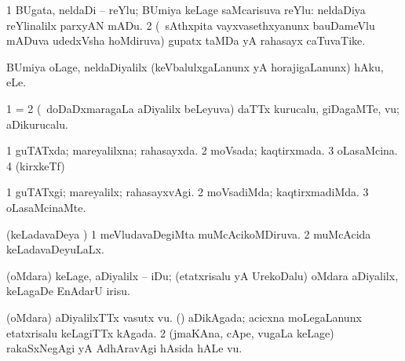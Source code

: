 {\bentry
{} 
\gl{\nA}
\expl{}
\bmng
\bnum
\num{1} BUgata, neldaDi -- reYlu; BUmiya keLage saMcarisuva reYlu:  neldaDiya reYlinalilx parxyAN mADu. 
\num{2} (\kanmu\ sAthxpita vayxvasethxyanunx bauDameVlu mADuva udedxVsha hoMdiruva) gupatx taMDa yA rahasayx caTuvaTike. 
\enum
\emng
\eentry

\bentry
{} 
\gl{\sakirx}
\expl{}
\bmng
 BUmiya oLage, neldaDiyalilx (keVbalulxgaLanunx yA horajigaLanunx) hAku, eLe. 
\emng
\eentry

\bentry
{} 
\gl{\nA}
\expl{}
\bmng
\bnum
\num{1} =  
\num{2} (\kanmu\ doDaDxmaragaLa aDiyalilx beLeyuva) daTTx kurucalu, giDagaMTe, \mo vu; aDikurucalu. 
\enum
\emng
\eentry

\bentry
{} 
\gl{\gu}
\expl{}
\bmng
\bnum
\num{1} guTATxda; mareyalilxna; rahasayxda. 
\num{2} moVsada; kaqtirxmada. 
\num{3} oLasaMcina. 
\num{4} (kirxkeTf)  
\enum
\emng
\eentry

\bentry
{} 
\gl{\kirxvi}
\expl{}
\bmng
\bnum
\num{1} guTATxgi; mareyalilx; rahasayxvAgi. 
\num{2} moVsadiMda; kaqtirxmadiMda. 
\num{3} oLasaMcinaMte. 
\enum
\emng
\eentry

\bentry
{} 
\gl{\gu}
\expl{}
\bmng
\emng
\eentry

\bentry
{} 
\gl{\kirxvi}
\expl{}
\bmng
\emng
\eentry

\bentry
{} 
\gl{\gu}
\expl{}
\bmng
 (keLadavaDeya \vi) 
\bnum
\num{1} meVludavaDegiMta muMcAcikoMDiruva. 
\num{2} muMcAcida keLadavaDeyuLaLx. 
\enum
\emng
\eentry

\bentry
{} 
\gl{\sakirx}
\bmng
 (oMdara) keLage, aDiyalilx -- iDu; (etatxrisalu yA UrekoDalu) oMdara aDiyalilx, keLagaDe EnAdarU irisu. 
\emng
\eentry

\bentry
{} 
\gl{\nA}
\expl{}
\bmng
\bnum
{} 
\banum
{} (oMdara) aDiyalilxTTx vasutx \mo vu. 
 (\kanmu) aDikAgada; acicxna moLegaLanunx etatxrisalu keLagiTTx kAgada. 
\eanum
\numie
\num{2} (jmaKAna, cApe, \mo vugaLa keLage) rakaSxNegAgi yA AdhAravAgi hAsida hALe \mo vu. 
\enum
\emng
\eentry

}
